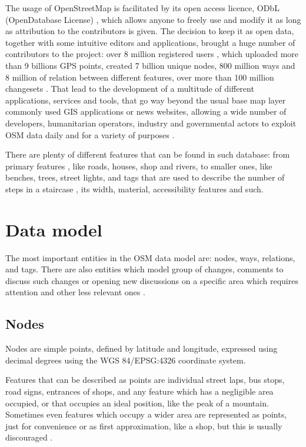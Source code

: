 \documentclass{Configuration_Files/PoliMi3i_thesis}
\begin{document}
The usage of OpenStreetMap is facilitated by its open access licence, ODbL (OpenDatabase License) \cite{OpenDatabaseLicense}, which allows anyone to freely use and modify it as long as attribution to the contributors is given. The decision to keep it as open data, together with some intuitive editors and applications, brought a huge number of contributors to the project: over 8 million registered users \cite{OpenStreetMapStatistics}, which uploaded more than 9 billions GPS points, created 7 billion unique nodes, 800 million ways and 8 million of relation between different features, over more than 100 million changesets \cite{openstreetmapblog100MillionEdits2021}. That lead to the development of a multitude of different applications, services and tools, that go way beyond the usual base map layer commonly used GIS applications or news websites, allowing a wide number of developers, humanitarian operators, industry and governmental actors to exploit OSM data daily and for a variety of purposes \cite{mooneyReviewOpenStreetMapData2017}.

There are plenty of different features that can be found in such database: from primary features \cite{MapFeaturesOpenStreetMap}, like roads, houses, shop and rivers, to smaller ones, like benches, trees, street lights, and tags that are used to describe the number of steps in a staircase \cite{TagHighwaySteps}, its width, material, accessibility features and such.

\section{Data model}
\label{sec:data_model}%

The most important entities in the OSM data model are: nodes, ways, relations, and tags. There are also entities which model group of changes, comments to discuss such changes or opening new discussions on a specific area which requires attention and other less relevant ones \cite{ElementsOpenStreetMapWiki}.

\subsection{Nodes}

Nodes are simple points, defined by latitude and longitude, expressed using decimal degrees using the WGS 84/EPSG:4326 coordinate system.

Features that can be described as points are individual street laps, bus stops, road signs, entrances of shops, and any feature which has a negligible area occupied, or that occupies an ideal position, like the peak of a mountain.
Sometimes even features which occupy a wider area are represented as points, just for convenience or as first approximation, like a shop, but this is usually discouraged \cite{ShouldUsePOIs}.
\end{document}
